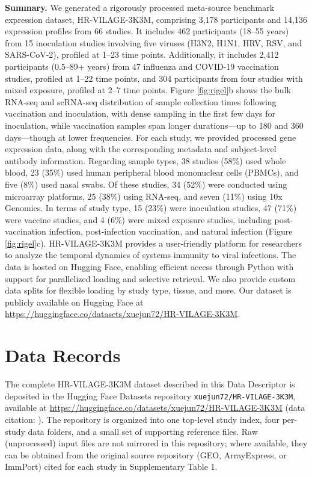 \documentclass[
  12pt]{article}
\begin{document}
\noindent\textbf{Summary.}
We generated a rigorously processed meta-source benchmark expression dataset, HR-VILAGE-3K3M, comprising 3{,}178 participants and 14{,}136 expression profiles from 66 studies. It includes 462 participants (18–55 years) from 15 inoculation studies involving five viruses (H3N2, H1N1, HRV, RSV, and SARS-CoV-2), profiled at 1–23 time points. Additionally, it includes 2{,}412 participants (0.5–89+ years) from 47 influenza and COVID-19 vaccination studies, profiled at 1–22 time points, and 304 participants from four studies with mixed exposure, profiled at 2–7 time points. Figure \ref{fig:rigel}b shows the bulk RNA-seq and scRNA-seq distribution of sample collection times following vaccination and inoculation, with dense sampling in the first few days for inoculation, while vaccination samples span longer durations—up to 180 and 360 days—though at lower frequencies. For each study, we provided processed gene expression data, along with the corresponding metadata and subject-level antibody information. Regarding sample types, 38 studies (58\%) used whole blood, 23 (35\%) used human peripheral blood mononuclear cells (PBMCs), and five (8\%) used nasal swabs. Of these studies, 34 (52\%) were conducted using microarray platforms, 25 (38\%) using RNA-seq, and seven (11\%) using 10x Genomics. In terms of study type, 15 (23\%) were inoculation studies, 47 (71\%) were vaccine studies, and 4 (6\%) were mixed exposure studies, including post-vaccination infection, post-infection vaccination, and natural infection (Figure \ref{fig:rigel}c). HR-VILAGE-3K3M provides a user-friendly platform for researchers to analyze the temporal dynamics of systems immunity to viral infections. The data is hosted on Hugging Face, enabling efficient access through Python with support for parallelized loading and selective retrieval. We also provide custom data splits for flexible loading by study type, tissue, and more. Our dataset is publicly available on Hugging Face at \url{https://huggingface.co/datasets/xuejun72/HR-VILAGE-3K3M}.


\section{Data Records}

The complete HR-VILAGE-3K3M dataset described in this Data Descriptor is deposited in the Hugging Face Datasets repository \texttt{xuejun72/HR-VILAGE-3K3M}, available at \url{https://huggingface.co/datasets/xuejun72/HR-VILAGE-3K3M} (data citation: \citep{sun2026hrvilagedataset}). The repository is organized into one top-level study index, four per-study data folders, and a small set of supporting reference files. Raw (unprocessed) input files are not mirrored in this repository; where available, they can be obtained from the original source repository (GEO, ArrayExpress, or ImmPort) cited for each study in Supplementary Table 1.
\end{document}
